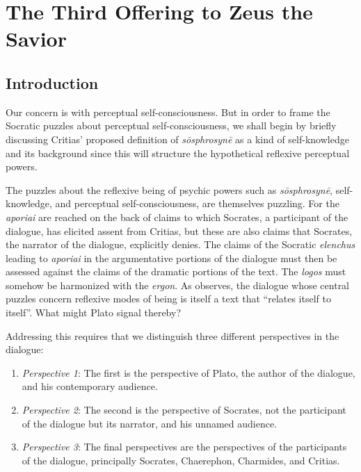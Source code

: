 \chapter{The Third Offering to Zeus the Savior} %
\label{cha:offering}

\section{Introduction} %
\label{sec:introduction}



Our concern is with perceptual self-consciousness. But in order to frame the Socratic puzzles about perceptual self-consciousness, we shall begin by briefly discussing Critias' proposed definition of \emph{sōsphrosynē} as a kind of self-knowledge and its background since this will structure the hypothetical reflexive perceptual powers. 

The puzzles about the reflexive being of psychic powers such as \emph{sōsphrosynē}, self-knowledge, and perceptual self-consciousness, are themselves puzzling. For the \emph{aporiai} are reached on the back of claims to which Socrates, a participant of the dialogue, has elicited assent from Critias, but these are also claims that Socrates, the narrator of the dialogue, explicitly denies. The claims of the Socratic \emph{elenchus} leading to \emph{aporiai} in the argumentative portions of the dialogue must then be assessed against the claims of the dramatic portions of the text. The \emph{logos} must somehow be harmonized with the \emph{ergon}. As \citet{Schmid:1998aa} observes, the dialogue whose central puzzles concern reflexive modes of being is itself a text that ``relates itself to itself''. What might Plato signal thereby?

Addressing this requires that we distinguish three different perspectives in the dialogue:

\begin{enumerate}[(1)]
	\item \emph{Perspective 1}: The first is the perspective of Plato, the author of the dialogue, and his contemporary audience.
	\item \emph{Perspective 2}: The second is the perspective of Socrates, not the participant of the dialogue but its narrator, and his unnamed audience.
	\item \emph{Perspective 3}: The final perspectives are the perspectives of the participants of the dialogue, principally Socrates, Chaerephon, Charmides, and Critias.
\end{enumerate}


